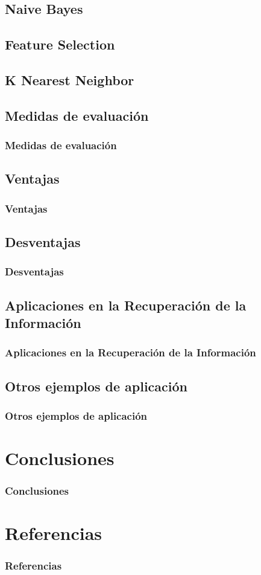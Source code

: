 \documentclass[t,compress,10pt,xcolor=dvipsnames]{beamer}
\begin{document}
	\subsection{Naive Bayes}

	\subsection{Feature Selection}

	\subsection{K Nearest Neighbor}
	
	\subsection{Medidas de evaluaci\'on}
	\frame
	{
		\frametitle{Medidas de evaluaci\'on}	
	}
	
	\subsection{Ventajas}
	\frame
	{
		\frametitle{Ventajas}
	}
	
	\subsection{Desventajas}
	\frame
	{
		\frametitle{Desventajas}
	}
	
	\subsection{Aplicaciones en la Recuperaci\'on de la Informaci\'on}
	\frame
	{
		\frametitle{Aplicaciones en la Recuperaci\'on de la Informaci\'on}
	}
	
	\subsection{Otros ejemplos de aplicaci\'on}
	\frame
	{
		\frametitle{Otros ejemplos de aplicaci\'on}
	}

	\section{Conclusiones}
	\frame
	{
		\frametitle{Conclusiones}
	}

	\section{Referencias}
	\frame
	{
		\frametitle{Referencias}
	}
\end{document}
